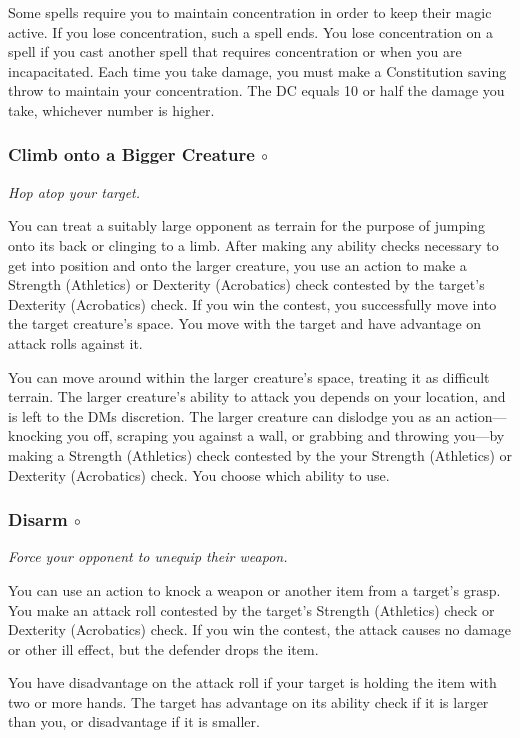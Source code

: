     Some spells require you to maintain concentration in order to keep their magic active.
    If you lose concentration, such a spell ends.
    You lose concentration on a spell if you cast another spell that requires concentration or when you are incapacitated.
    Each time you take damage, you must make a Constitution saving throw to maintain your concentration.
    The DC equals 10 or half the damage you take, whichever number is higher.
\subsubsection{Climb onto a Bigger Creature $\circ$}
    \textit{Hop atop your target.}

    You can treat a suitably large opponent as terrain for the purpose of jumping onto its back or clinging to a limb.
    After making any ability checks necessary to get into position and onto the larger creature, you use an action to make a Strength (Athletics) or Dexterity (Acrobatics) check contested by the target's Dexterity (Acrobatics) check.
    If you win the contest, you successfully move into the target creature's space.
    You move with the target and have advantage on attack rolls against it.

    You can move around within the larger creature's space, treating it as difficult terrain.
    The larger creature's ability to attack you depends on your location, and is left to the DMs discretion.
    The larger creature can dislodge you as an action—knocking you off, scraping you against a wall, or grabbing and throwing you—by making a Strength (Athletics) check contested by the your Strength (Athletics) or Dexterity (Acrobatics) check.
    You choose which ability to use.
\subsubsection{Disarm $\circ$}
    \textit{Force your opponent to unequip their weapon.}

    You can use an action to knock a weapon or another item from a target's grasp.
    You make an attack roll contested by the target's Strength (Athletics) check or Dexterity (Acrobatics) check.
    If you win the contest, the attack causes no damage or other ill effect, but the defender drops the item.

    You have disadvantage on the attack roll if your target is holding the item with two or more hands.
    The target has advantage on its ability check if it is larger than you, or disadvantage if it is smaller.
